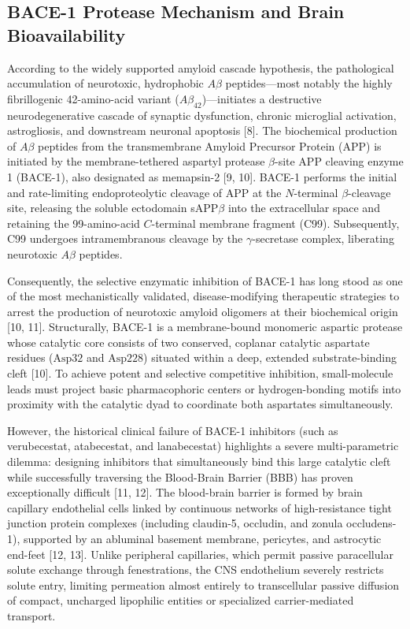 \documentclass[10pt,a4paper]{article}
\begin{document}
\subsection{BACE-1 Protease Mechanism and Brain Bioavailability}
According to the widely supported amyloid cascade hypothesis, the pathological accumulation of neurotoxic, hydrophobic $A\beta$ peptides---most notably the highly fibrillogenic 42-amino-acid variant ($A\beta_{42}$)---initiates a destructive neurodegenerative cascade of synaptic dysfunction, chronic microglial activation, astrogliosis, and downstream neuronal apoptosis [8]. The biochemical production of $A\beta$ peptides from the transmembrane Amyloid Precursor Protein (APP) is initiated by the membrane-tethered aspartyl protease $\beta$-site APP cleaving enzyme 1 (BACE-1), also designated as memapsin-2 [9, 10]. BACE-1 performs the initial and rate-limiting endoproteolytic cleavage of APP at the $N$-terminal $\beta$-cleavage site, releasing the soluble ectodomain sAPP$\beta$ into the extracellular space and retaining the 99-amino-acid $C$-terminal membrane fragment (C99). Subsequently, C99 undergoes intramembranous cleavage by the $\gamma$-secretase complex, liberating neurotoxic $A\beta$ peptides.

Consequently, the selective enzymatic inhibition of BACE-1 has long stood as one of the most mechanistically validated, disease-modifying therapeutic strategies to arrest the production of neurotoxic amyloid oligomers at their biochemical origin [10, 11]. Structurally, BACE-1 is a membrane-bound monomeric aspartic protease whose catalytic core consists of two conserved, coplanar catalytic aspartate residues ($\text{Asp}32$ and $\text{Asp}228$) situated within a deep, extended substrate-binding cleft [10]. To achieve potent and selective competitive inhibition, small-molecule leads must project basic pharmacophoric centers or hydrogen-bonding motifs into proximity with the catalytic dyad to coordinate both aspartates simultaneously.

However, the historical clinical failure of BACE-1 inhibitors (such as verubecestat, atabecestat, and lanabecestat) highlights a severe multi-parametric dilemma: designing inhibitors that simultaneously bind this large catalytic cleft while successfully traversing the Blood-Brain Barrier (BBB) has proven exceptionally difficult [11, 12]. The blood-brain barrier is formed by brain capillary endothelial cells linked by continuous networks of high-resistance tight junction protein complexes (including claudin-5, occludin, and zonula occludens-1), supported by an abluminal basement membrane, pericytes, and astrocytic end-feet [12, 13]. Unlike peripheral capillaries, which permit passive paracellular solute exchange through fenestrations, the CNS endothelium severely restricts solute entry, limiting permeation almost entirely to transcellular passive diffusion of compact, uncharged lipophilic entities or specialized carrier-mediated transport.
\end{document}

